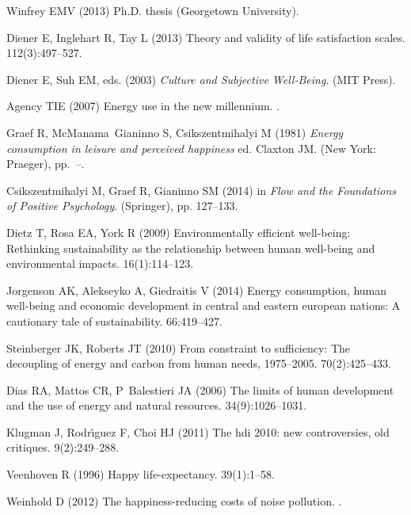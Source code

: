 \documentclass[10pt, letterpaper]{article}
\begin{document}
\begin{spacing}{1.4}
\begin{thebibliography}{10}
Winfrey EMV (2013) Ph.D. thesis (Georgetown University).

Diener E, Inglehart R, Tay L (2013) Theory and validity of life satisfaction
  scales.
 112(3):497--527.

Diener E, Suh EM, eds. (2003) {\em Culture and Subjective Well-Being}.
\newblock (MIT Press).

Agency TIE (2007) Energy use in the new millennium.
.

Graef R, McManama~Gianinno S, Csikszentmihalyi M (1981) {\em Energy consumption
  in leisure and perceived happiness} ed.{} Claxton JM.
\newblock (New York: Praeger), pp.~--.

Csikszentmihalyi M, Graef R, Gianinno SM (2014) in {\em Flow and the
  Foundations of Positive Psychology}.
\newblock (Springer), pp. 127--133.

Dietz T, Rosa EA, York R (2009) Environmentally efficient well-being:
  Rethinking sustainability as the relationship between human well-being and
  environmental impacts.
 16(1):114--123.

Jorgenson AK, Alekseyko A, Giedraitis V (2014) Energy consumption, human
  well-being and economic development in central and eastern european nations:
  A cautionary tale of sustainability.
 66:419--427.

Steinberger JK, Roberts JT (2010) From constraint to sufficiency: The
  decoupling of energy and carbon from human needs, 1975--2005.
 70(2):425--433.

Dias RA, Mattos CR, P~Balestieri JA (2006) The limits of human development and
  the use of energy and natural resources.
 34(9):1026--1031.

Klugman J, Rodr{\'\i}guez F, Choi HJ (2011) The hdi 2010: new controversies,
  old critiques.
 9(2):249--288.

Veenhoven R (1996) Happy life-expectancy.
 39(1):1--58.

Weinhold D (2012) The happiness-reducing costs of noise pollution.
.


\end{thebibliography}
\end{spacing}
\end{document}
